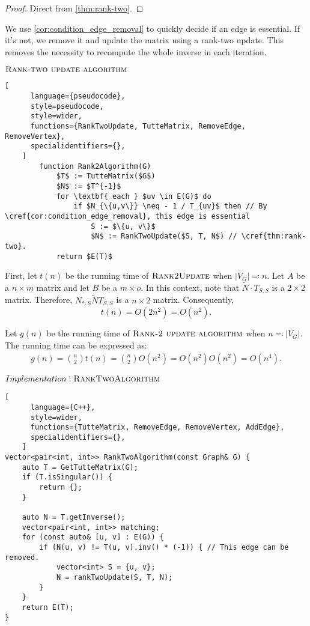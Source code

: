 \begin{proof}
    Direct from \cref{thm:rank-two}. 
\end{proof}

We use \cref{cor:condition_edge_removal} to quickly decide if an edge is essential. 
If it's not, we remove it and update the matrix using a rank-two update. 
This removes the necessity to recompute the whole inverse in each iteration.

\begin{programruledcaption}{\(\textsc{Rank-two update algorithm}\)}
    \begin{lstlisting}[
      language={pseudocode},
      style=pseudocode,
      style=wider,
      functions={RankTwoUpdate, TutteMatrix, RemoveEdge, RemoveVertex},
      specialidentifiers={},
    ]
        function Rank2Algorithm(G)
            $T$ := TutteMatrix($G$)
            $N$ := $T^{-1}$
            for \textbf{ each } $uv \in E(G)$ do
                if $N_{\{u,v\}} \neq - 1 / T_{uv}$ then // By \cref{cor:condition_edge_removal}, this edge is essential
                    S := $\{u, v\}$
                    $N$ := RankTwoUpdate($S, T, N$) // \cref{thm:rank-two}.
            return $E(T)$
    \end{lstlisting}
\end{programruledcaption}

First, let \(t(n)\) be the running time of \(\textsc{Rank2Update}\) when \(|V_G| \eqcolon n\).
Let \(A\) be a \(n \times m\) matrix and let \(B\) be a \(m \times o\).
In this context, note that \(\tilde{N} \cdot T_{S, S}\) is a \(2 \times 2\) matrix.
Therefore, \(N_{*, S}\tilde{N}T_{S, S}\) is a \(n \times 2\) matrix.
Consequently,
\[
    t(n) = O(2n^2) = O(n^2).
\]

Let \(g(n)\) be the running time of \(\textsc{Rank-2 update algorithm}\) when \(n \eqcolon |V_G|\).
The running time can be expressed as:
\begin{align*}
    g(n) = \binom{n}{2} t(n) = \binom{n}{2} O(n^2) = O(n^2) O(n^2) = O(n^4).
\end{align*}

\begin{programruledcaption}{\(Implementation: \textsc{RankTwoAlgorithm}\)}
    \begin{lstlisting}[
      language={C++},
      style=wider,
      functions={TutteMatrix, RemoveEdge, RemoveVertex, AddEdge},
      specialidentifiers={},
    ]
vector<pair<int, int>> RankTwoAlgorithm(const Graph& G) {
    auto T = GetTutteMatrix(G);
    if (T.isSingular()) {
        return {};
    } 

    auto N = T.getInverse();
    vector<pair<int, int>> matching;
    for (const auto& [u, v] : E(G)) {
        if (N(u, v) != T(u, v).inv() * (-1)) { // This edge can be removed.
            vector<int> S = {u, v};
            N = rankTwoUpdate(S, T, N);
        }
    }
    return E(T);
}
    \end{lstlisting}
\end{programruledcaption}